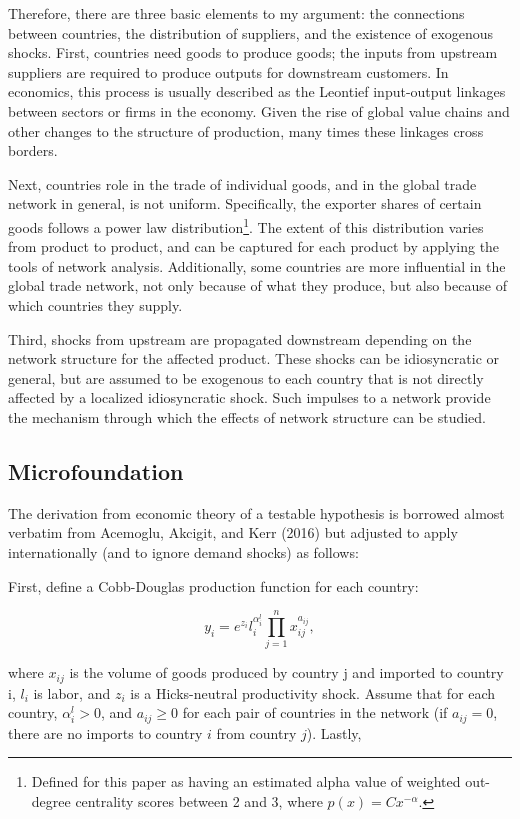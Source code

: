 \documentclass[10pt,letterpaper,pdftex]{article}
\begin{document}
Therefore, there are three basic elements to my argument: the connections between countries, the distribution of suppliers, and the existence of exogenous shocks. First, countries need goods to produce goods; the inputs from upstream suppliers are required to produce outputs for downstream customers. In economics, this process is usually described as the Leontief input-output linkages between sectors or firms in the economy. Given the rise of global value chains and other changes to the structure of production, many times these linkages cross borders.

Next, countries role in the trade of individual goods, and in the global trade network in general, is not uniform. Specifically, the exporter shares of certain goods follows a power law distribution\footnote{Defined for this paper as having an estimated alpha value of weighted out-degree centrality scores between 2 and 3, where $p(x) = Cx^{-\alpha}$.}. The extent of this distribution varies from product to product, and can be captured for each product by applying the tools of network analysis. Additionally, some countries are more influential in the global trade network, not only because of what they produce, but also because of which countries they supply.

Third, shocks from upstream are propagated downstream depending on the network structure for the affected product. These shocks can be idiosyncratic or general, but are assumed to be exogenous to each country that is not directly affected by a localized idiosyncratic shock. Such impulses to a network provide the mechanism through which the effects of network structure can be studied.

\subsection{Microfoundation} \label{modelsmicro}

The derivation from economic theory of a testable hypothesis is borrowed almost verbatim from Acemoglu, Akcigit, and Kerr (2016) but adjusted to apply internationally (and to ignore demand shocks) as follows:

First, define a Cobb-Douglas production function for each country:

\begin{equation*}
y_i = e^{z_i}l_i^{\alpha_i^l} \prod_{j=1}^{n} x_{ij}^{a_{ij}},
\end{equation*}

where $x_{ij}$ is the volume of goods produced by country j and imported to country i, $l_i$ is labor, and $z_i$ is a Hicks-neutral productivity shock. Assume that for each country, $\alpha_i^l >0$, and $a_{ij} \geq 0$ for each pair of countries in the network (if $a_{ij} = 0$, there are no imports to country $i$ from country $j$). Lastly,
\end{document}
